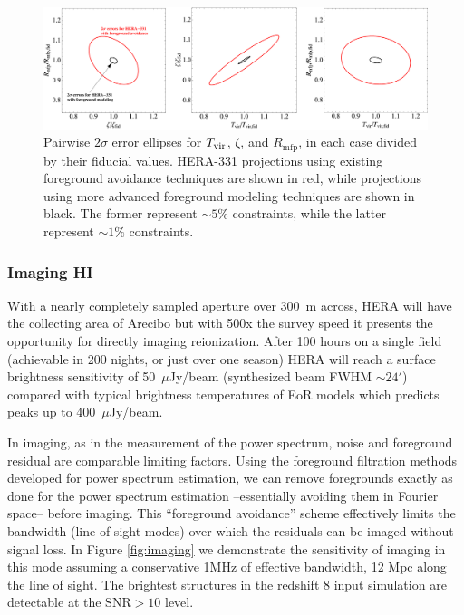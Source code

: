 \documentclass[preprint]{aastex}
\begin{document}
\begin{figure}[t]\centering
\includegraphics[width=\textwidth]{plots/Pspec/OPTMIDellipses.pdf}
\caption{Pairwise $2\sigma$ error ellipses for $T_{\rm vir}$, $\zeta$, and $R_\textrm{mfp}$, in each case divided by their fiducial values.  HERA-331 projections using existing foreground avoidance techniques are shown in red, while projections using more advanced foreground modeling techniques are shown in black.  The former represent $\sim 5\%$ constraints, while the latter represent $\sim 1\%$ constraints.\label{fig:ErrorEllipses}}
\end{figure}


\subsubsection{Imaging HI}
\label{sec:imaging_HI}
With a nearly completely sampled aperture over 300~m across, HERA will have the collecting area of Arecibo but 
with 500x the survey speed it presents the opportunity for directly imaging reionization.  After 100 hours on a 
single field (achievable in 200 nights, or just over one season) HERA will reach a surface brightness sensitivity 
of 50~$\mu$Jy/beam (synthesized beam FWHM $\sim 24'$) compared with typical brightness temperatures of EoR models 
which predicts peaks up to 400~$\mu$Jy/beam.

In imaging, as in the measurement of the power spectrum, noise and foreground residual are comparable limiting 
factors. Using the foreground filtration methods developed for power spectrum estimation, we can remove 
foregrounds exactly as done for the power spectrum estimation --essentially avoiding them in Fourier space-- before imaging.  This ``foreground avoidance'' scheme effectively limits the bandwidth (line of sight 
modes) over which the residuals can be imaged without signal loss.  In Figure \ref{fig:imaging} we demonstrate the 
sensitivity of imaging in this mode assuming a conservative 1MHz of effective bandwidth, 12 Mpc along the line of 
sight.  The brightest structures in the redshift 8 input simulation are detectable at the SNR$>10$ level.
\end{document}
